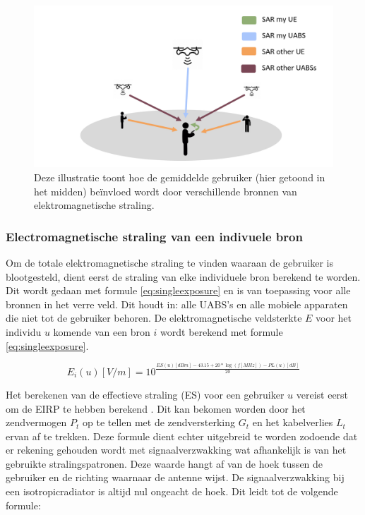 \documentclass[twocolumn]{phdsymp_dutch}
\begin{document}
\begin{figure}[h!]
\centering
  \includegraphics[width=\linewidth]{networkIllustrationSARSources.png}
  \caption{Deze illustratie toont hoe de gemiddelde gebruiker (hier getoond in het midden) be\"invloed wordt door verschillende bronnen van elektromagnetische straling.}
  \label{fig:netwerkIllustration}
\end{figure}

\subsubsection{Electromagnetische straling van een indivuele bron}
\label{sec:calculatingexposure}

Om de totale elektromagnetische straling te vinden waaraan de gebruiker is blootgesteld, dient eerst
de straling van elke individuele bron berekend te worden.
Dit wordt gedaan met formule  \ref{eq:singleexposure} en is van toepassing voor alle bronnen in het verre veld.
Dit houdt in: alle  \gls{UABS}'s en alle mobiele apparaten die niet tot de gebruiker behoren.
De elektromagnetische veldsterkte $E$ voor het individu $u$ komende van een bron $i$ wordt berekend 
met formule \ref{eq:singleexposure}. 


\begin{equation}
E_i(u) [V/m] = 10^{\frac{ES(u)[dBm] - 43.15 + 20*\log(f [MHz])- PL(u) [dB]}{20}}
\label{eq:singleexposure}
\end{equation}

Het berekenen van de effectieve straling (ES) voor een gebruiker $u$ vereist eerst om de  \gls{EIRP} te hebben berekend 
 \cite{J6_originalExposureFormula,J1}. Dit kan bekomen worden door het zendvermogen $P_t$ op te tellen met de zendversterking $G_t$
 en het kabelverlies $L_t$ ervan af te trekken.
 Deze formule dient echter uitgebreid te worden zodoende dat er rekening gehouden wordt met signaalverzwakking wat afhankelijk is van 
 het gebruikte stralingspatronen. Deze waarde hangt af van de hoek tussen de gebruiker en de richting waarnaar de antenne wijst. 
 De signaalverzwakking bij een \gls{isotropicradiator} is altijd nul ongeacht de hoek.
 Dit leidt tot de volgende formule:
\end{document}
